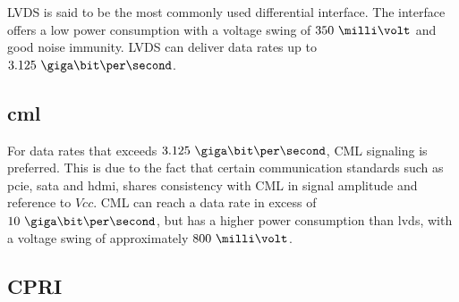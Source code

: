 \documentclass[main.tex]{subfiles}
\begin{document}
LVDS is said to be the most commonly used differential interface. The interface offers a low power consumption with a voltage swing of $350\ \milli\volt$ and good noise immunity. LVDS can deliver data rates up to $3.125\ \giga\bit\per\second$. \cite{ti08lvds}

\subsection{\gls{cml}}

For data rates that exceeds $3.125\ \giga\bit\per\second$, CML signaling is preferred. This is due to the fact that certain communication standards such as \acrshort{pcie}, \acrshort{sata} and \acrshort{hdmi}, shares consistency with CML in signal amplitude and reference to $Vcc$. CML can reach a data rate in excess of $10\ \giga\bit\per\second$, but has a higher power consumption than \gls{lvds}, with a voltage swing of approximately $800\ \milli\volt$. \cite{ti08lvds}

\subsection{CPRI}

\end{document}
